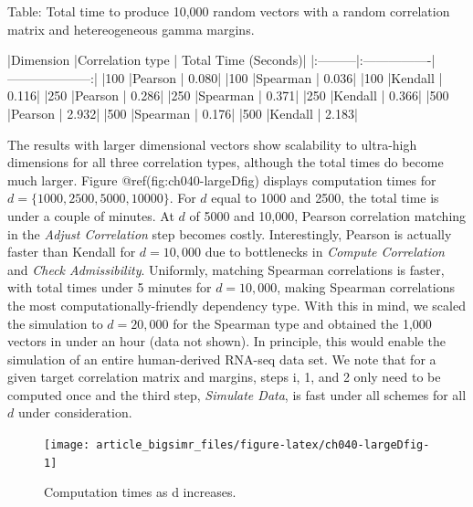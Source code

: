 \documentclass[
]{jss}
\begin{document}
\begin{CodeChunk}


Table: Total time to produce 10,000 random vectors with a random correlation matrix and hetereogeneous gamma margins.

|Dimension |Correlation type | Total Time (Seconds)|
|:---------|:----------------|--------------------:|
|100       |Pearson          |                0.080|
|100       |Spearman         |                0.036|
|100       |Kendall          |                0.116|
|250       |Pearson          |                0.286|
|250       |Spearman         |                0.371|
|250       |Kendall          |                0.366|
|500       |Pearson          |                2.932|
|500       |Spearman         |                0.176|
|500       |Kendall          |                2.183|

\end{CodeChunk}

The results with larger dimensional vectors show scalability to
ultra-high dimensions for all three correlation types, although the
total times do become much larger. Figure @ref(fig:ch040-largeDfig)
displays computation times for \(d=\{1000, 2500, 5000, 10000\}\). For
\(d\) equal to 1000 and 2500, the total time is under a couple of
minutes. At \(d\) of 5000 and 10,000, Pearson correlation matching in
the \emph{Adjust Correlation} step becomes costly. Interestingly,
Pearson is actually faster than Kendall for \(d=10,000\) due to
bottlenecks in \emph{Compute Correlation} and \emph{Check
Admissibility}. Uniformly, matching Spearman correlations is faster,
with total times under 5 minutes for \(d=10,000\), making Spearman
correlations the most computationally-friendly dependency type. With
this in mind, we scaled the simulation to \(d=20,000\) for the Spearman
type and obtained the 1,000 vectors in under an hour (data not shown).
In principle, this would enable the simulation of an entire
human-derived RNA-seq data set. We note that for a given target
correlation matrix and margins, steps i, 1, and 2 only need to be
computed once and the third step, \emph{Simulate Data}, is fast under
all schemes for all \(d\) under consideration.

\begin{CodeChunk}
\begin{figure}

{\centering \texttt{[image: article\_bigsimr\_files/figure-latex/ch040-largeDfig-1]} 

}

\caption[Computation times as d increases]{Computation times as d increases.}\label{fig:ch040-largeDfig}
\end{figure}
\end{CodeChunk}
\end{document}
